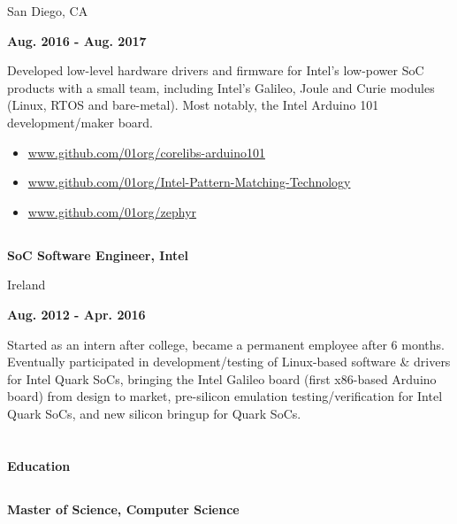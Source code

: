 \documentclass[6pt]{article}
\begin{document}
\begin{minipage}{38em}
\begin{minipage}{20em}
{San Diego, CA}
\end{minipage}
\hfill
\begin{minipage}{12em}
{\bfseries Aug. 2016 - Aug. 2017}
\end{minipage}
\begin{flushleft}
Developed low-level hardware drivers and firmware for Intel's low-power SoC products
with a small team, including Intel's Galileo, Joule and Curie modules (Linux, RTOS and
bare-metal). Most notably, the Intel Arduino 101 development/maker board.
\begin{itemize}
    \setlength\itemsep{0em}
    \item \url{www.github.com/01org/corelibs-arduino101}
    \item \url{www.github.com/01org/Intel-Pattern-Matching-Technology}
    \item \url{www.github.com/01org/zephyr}
\end{itemize}
\end{flushleft}
\dotfill
%
%
\subsection*{}
\begin{minipage}{20em}
{\bfseries SoC Software Engineer, Intel

Ireland}

\end{minipage}
\hfill
\begin{minipage}{12em}
{\bfseries \hfill Aug. 2012 - Apr. 2016}
\end{minipage}
\begin{flushleft}
Started as an intern after college, became a permanent employee after 6 months. Eventually
participated in development/testing of Linux-based software \& drivers for Intel Quark SoCs,
bringing the Intel Galileo board (first x86-based Arduino board) from design to market,
pre-silicon emulation testing/verification for Intel Quark SoCs, and new silicon bringup for Quark SoCs.
\end{flushleft}

\section*{}
{\Large \bfseries Education}

\dotfill
\subsection*{}
\begin{flushleft}
{\bfseries Master of Science, Computer Science}


\end{flushleft}
\end{minipage}
\end{document}
